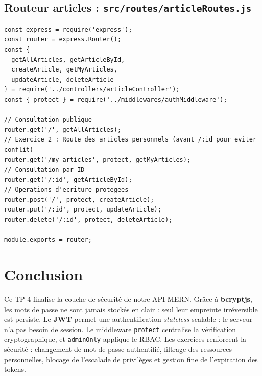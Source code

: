 \documentclass[12pt, a4paper]{article}
\begin{document}
\subsection{Routeur articles : \texttt{src/routes/articleRoutes.js}}
\begin{lstlisting}
const express = require('express');
const router = express.Router();
const {
  getAllArticles, getArticleById,
  createArticle, getMyArticles,
  updateArticle, deleteArticle
} = require('../controllers/articleController');
const { protect } = require('../middlewares/authMiddleware');

// Consultation publique
router.get('/', getAllArticles);
// Exercice 2 : Route des articles personnels (avant /:id pour eviter conflit)
router.get('/my-articles', protect, getMyArticles);
// Consultation par ID
router.get('/:id', getArticleById);
// Operations d'ecriture protegees
router.post('/', protect, createArticle);
router.put('/:id', protect, updateArticle);
router.delete('/:id', protect, deleteArticle);

module.exports = router;
\end{lstlisting}

\section*{Conclusion}
Ce TP 4 finalise la couche de sécurité de notre API MERN. Grâce à \textbf{bcryptjs}, les mots de passe ne sont jamais stockés en clair : seul leur empreinte irréversible est persiste. Le \textbf{JWT} permet une authentification \textit{stateless} scalable : le serveur n'a pas besoin de session. Le middleware \texttt{protect} centralise la vérification cryptographique, et \texttt{adminOnly} applique le RBAC. Les exercices renforcent la sécurité : changement de mot de passe authentifié, filtrage des ressources personnelles, blocage de l'escalade de privilèges et gestion fine de l'expiration des tokens.
\end{document}
